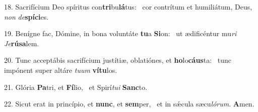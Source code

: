 18. Sacrifícium Deo spíritus con\textbf{tri}bu\textbf{lá}tus: \ast\  cor contrítum et humiliátum, Deus, \textit{non} \textit{de}\textbf{spí}\textbf{ci}es.\

19. Benígne fac, Dómine, in bona voluntáte \textbf{tu}a \textbf{Si}on: \ast\  ut ædificéntur mu\textit{ri} \textit{Je}\textbf{rú}\textbf{sa}lem.\

20. Tunc acceptábis sacrifícium justítiæ, oblatiónes, et \textbf{ho}lo\textbf{cáus}ta: \ast\  tunc impónent super altáre \textit{tu}\textit{um} \textbf{ví}\textbf{tu}los.\

21. Glória \textbf{Pa}tri, et \textbf{Fí}lio, \ast\  et Spirí\textit{tu}\textit{i} \textbf{Sanc}to.\

22. Sicut erat in princípio, et \textbf{nunc}, et \textbf{sem}per, \ast\  et in sǽcula sæcu\textit{ló}\textit{rum}. \textbf{A}men.\

